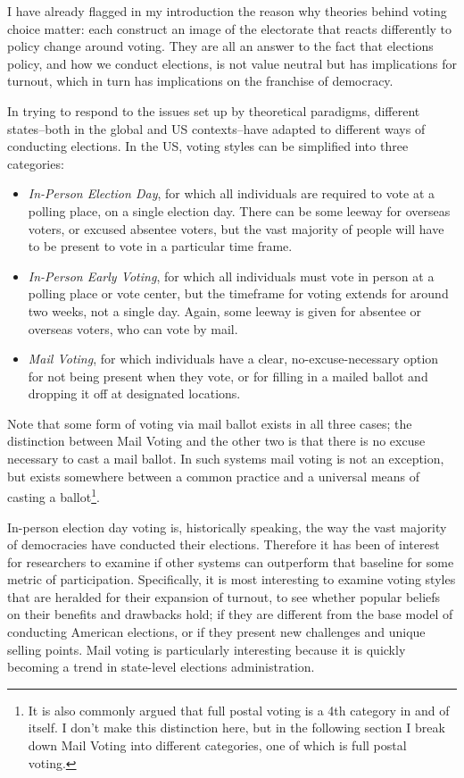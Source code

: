 \documentclass[12pt,twoside]{reedthesis}
\begin{document}
  I have already flagged in my introduction the reason why theories behind
  voting choice matter: each construct an image of the electorate that
  reacts differently to policy change around voting. They are all an
  answer to the fact that elections policy, and how we conduct elections,
  is not value neutral but has implications for turnout, which in turn has
  implications on the franchise of democracy.
  
  In trying to respond to the issues set up by theoretical paradigms,
  different states--both in the global and US contexts--have adapted to
  different ways of conducting elections. In the US, voting styles can be
  simplified into three categories:
  
  \begin{itemize}
  \item
    \emph{In-Person Election Day}, for which all individuals are required
    to vote at a polling place, on a single election day. There can be
    some leeway for overseas voters, or excused absentee voters, but the
    vast majority of people will have to be present to vote in a
    particular time frame.
  \item
    \emph{In-Person Early Voting}, for which all individuals must vote in
    person at a polling place or vote center, but the timeframe for voting
    extends for around two weeks, not a single day. Again, some leeway is
    given for absentee or overseas voters, who can vote by mail.
  \item
    \emph{Mail Voting}, for which individuals have a clear,
    no-excuse-necessary option for not being present when they vote, or
    for filling in a mailed ballot and dropping it off at designated
    locations.
  \end{itemize}
  
  Note that some form of voting via mail ballot exists in all three cases;
  the distinction between Mail Voting and the other two is that there is
  no excuse necessary to cast a mail ballot. In such systems mail voting
  is not an exception, but exists somewhere between a common practice and
  a universal means of casting a ballot\footnote{It is also commonly
    argued that full postal voting is a 4th category in and of itself. I
    don't make this distinction here, but in the following section I break
    down Mail Voting into different categories, one of which is full
    postal voting.}.
  
  In-person election day voting is, historically speaking, the way the
  vast majority of democracies have conducted their elections. Therefore
  it has been of interest for researchers to examine if other systems can
  outperform that baseline for some metric of participation. Specifically,
  it is most interesting to examine voting styles that are heralded for
  their expansion of turnout, to see whether popular beliefs on their
  benefits and drawbacks hold; if they are different from the base model
  of conducting American elections, or if they present new challenges and
  unique selling points. Mail voting is particularly interesting because
  it is quickly becoming a trend in state-level elections administration.
  
\end{document}
